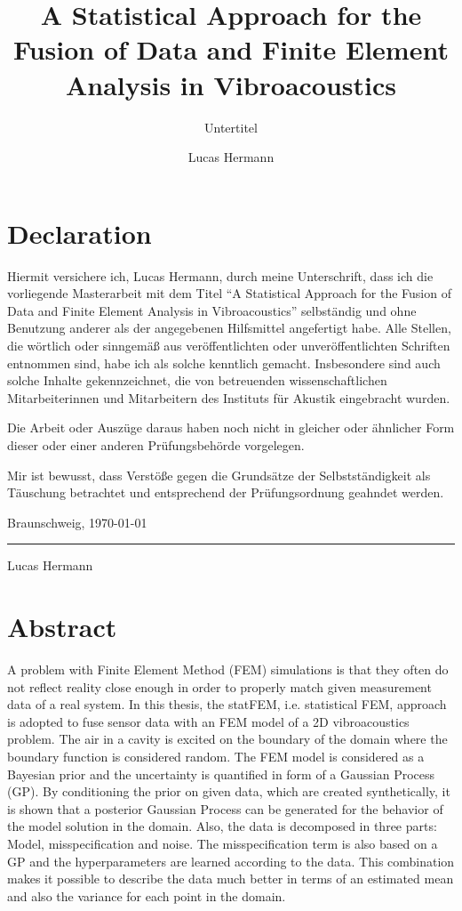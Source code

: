 \documentclass[%
  a4paper,oneside,%
  11pt,%
  smallchapters,
  style=printdev,
  extramargin,
  green,%
  rgb, <cmyk>
  ]{tubsbook}
\title{A Statistical Approach for the Fusion of Data and
Finite Element Analysis in Vibroacoustics}
\subtitle{Untertitel}
\author{Lucas Hermann}
\begin{document}


\chapter*{Declaration}
Hiermit versichere ich, Lucas Hermann, durch meine Unterschrift, dass ich die
vorliegende Masterarbeit mit dem Titel ``A Statistical Approach for the Fusion of Data and Finite Element Analysis in Vibroacoustics'' selbständig und ohne Benutzung
anderer als der angegebenen Hilfsmittel angefertigt habe. Alle Stellen, die wörtlich oder sinngemäß aus veröffentlichten oder unveröffentlichten Schriften entnommen sind, habe ich als
solche kenntlich gemacht. Insbesondere sind auch solche Inhalte gekennzeichnet, die von
betreuenden wissenschaftlichen Mitarbeiterinnen und Mitarbeitern des Instituts für Akustik eingebracht wurden.

Die Arbeit oder Auszüge daraus haben noch nicht in gleicher oder ähnlicher Form dieser
oder einer anderen Prüfungsbehörde vorgelegen.

Mir ist bewusst, dass Verstöße gegen die Grundsätze der Selbstständigkeit als Täuschung
betrachtet und entsprechend der Prüfungsordnung geahndet werden.

\begin{flushright}
Braunschweig, \today
\end{flushright}

\vspace{2cm}
\hspace{2cm}\rule{5cm}{1pt}

\hspace{2cm}\small{Lucas Hermann} 

\chapter*{Abstract}
A problem with Finite Element Method (FEM) simulations is that they often do not reflect reality close enough in order to properly match given measurement data of a real system. In this thesis, the statFEM, i.e. statistical FEM, approach is adopted to fuse sensor data with an FEM model of a 2D vibroacoustics problem. The air in a cavity is excited on the boundary of the domain where the boundary function is considered random. The FEM model is considered as a Bayesian prior and the uncertainty is quantified in form of a Gaussian Process (GP). By conditioning the prior on given data, which are created synthetically, it is shown that a posterior Gaussian Process can be generated for the behavior of the model solution in the domain. Also, the data is decomposed in three parts: Model, misspecification and noise. The misspecification term is also based on a GP and the hyperparameters are learned according to the data. This combination makes it possible to describe the data much better in terms of an estimated mean and also the variance for each point in the domain. 
\end{document}
